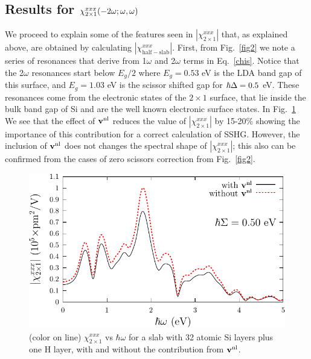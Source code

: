 \documentclass[floatfix,prb,aps,superscriptaddress,11pt,preprint,letterpaper]{revtex4}
\begin{document}
\subsection{\texorpdfstring{Results for $\chi^{xxx}_{2\times 1}(-2\omega;\omega,\omega)$}
{Results for Xxxx(2x1)(-2w;w,w)}}

We proceed to explain 
some of the features seen in $|\chi^{xxx}_{2\times 1}|$ that, as
explained above, are obtained 
by calculating $|\chi^{xxx}_{\mathrm{half-slab}}|$.
First, from Fig.~\ref{fig2} we note a series of resonances 
that derive from 1$\omega$ and 2$\omega$ terms in
Eq.~\eqref{chis}. 
Notice that the 
2$\omega$ resonances start below $E_g/2$ where $E_g=0.53$ eV is the LDA
band gap of this surface, and $E_g=1.03$ eV is the scissor shifted gap for
$\hbar\Delta=0.5$ eV.
These resonances
come from the electronic states of the 
$2\times 1$ surface, that lie inside the bulk band gap of Si and are the 
well known electronic surface states.
In Fig.~\ref{fig3}
We see that the effect of $\mathbf{v}^{\mathrm{nl}}$
 reduces the value of   
$|\chi^{xxx}_{2\times 1}|$  
by 15-20\% 
showing the importance of this contribution for a correct calculation  
of SSHG.  
However, the inclusion of $\mathbf{v}^{\mathrm{nl}}$ does not
changes the 
spectral shape of $|\chi^{xxx}_{2\times 1}|$;
 this also can be confirmed from
the cases of zero scissors correction from Fig.~\ref{fig2}.
%
\begin{figure}
\centering 
\includegraphics[scale=.8]{plots/fig3}
\caption{(color on line) 
$\chi^{xxx}_{2\times 1}$
vs $\hbar\omega$ for a slab with 32 
atomic Si layers plus one H layer, 
with and without the contribution from $\mathbf{v}^{\mathrm{nl}}$.
\label{fig3}} 
\end{figure}
\end{document}
